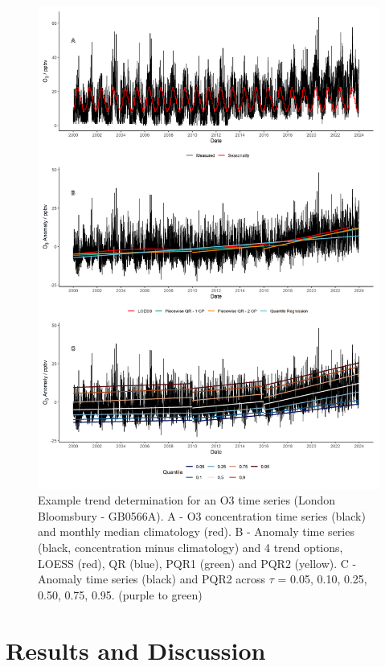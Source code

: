 \documentclass[journal abbreviation, manuscript]{copernicus}
\begin{document}
\begin{figure}[p]
\includegraphics[width=12cm]{plots/method.png}
\caption{Example trend determination for an O3 time series (London Bloomsbury - GB0566A). A - O3 concentration time series (black) and monthly median climatology (red). B - Anomaly time series (black, concentration minus climatology) and 4 trend options, LOESS (red), QR (blue), PQR1 (green) and PQR2 (yellow). C - Anomaly time series (black) and PQR2 across $\tau$ = 0.05, 0.10, 0.25, 0.50, 0.75, 0.95. (purple to green)}
\label{method_plot}
\end{figure}


\clearpage
\section{Results and Discussion}
\end{document}
